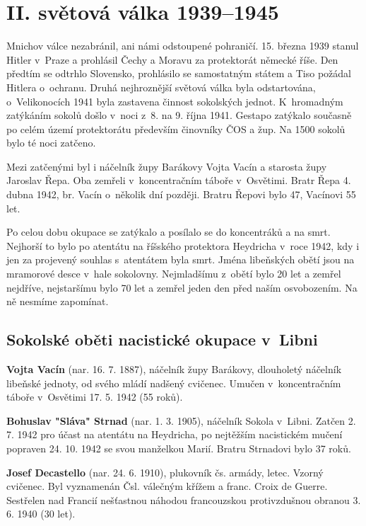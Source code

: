 \documentclass[a5paper, 11pt, twoside]{article}
\begin{document}
\section{II. světová válka
1939--1945}

Mnichov válce nezabránil, ani námi odstoupené pohraničí. 15. března 1939
stanul Hitler v~Praze a prohlásil Čechy a Moravu za protektorát německé
říše. Den předtím se odtrhlo Slovensko, prohlásilo se samostatným státem
a Tiso požádal Hitlera o~ochranu. Druhá nejhroznější světová válka byla
odstartována, o~Velikonocích 1941 byla zastavena činnost sokolských
jednot. K~hromadným zatýkáním sokolů došlo v~noci z~8. na 9. října 1941.
Gestapo zatýkalo současně po celém území protektorátu především
činovníky ČOS a žup. Na 1500 sokolů bylo té noci zatčeno.

Mezi zatčenými byl i náčelník župy Barákovy Vojta Vacín a starosta župy
Jaroslav Řepa. Oba zemřeli v~koncentračním táboře v~Osvětimi. Bratr Řepa
4. dubna 1942, br. Vacín o~několik dní později. Bratru Řepovi bylo 47,
Vacínovi 55 let.

Po celou dobu okupace se zatýkalo a posílalo se do koncentráků a na
smrt. Nejhorší to bylo po atentátu na říšského protektora Heydricha
v~roce 1942, kdy i jen za projevený souhlas s~atentátem byla smrt. Jména
libeňských obětí jsou na mramorové desce v~hale sokolovny. Nejmladšímu
z~obětí bylo 20 let a zemřel nejdříve, nejstaršímu bylo 70 let a zemřel
jeden den před naším osvobozením. Na ně nesmíme zapomínat.

\subsection{Sokolské oběti nacistické okupace v~Libni}

\textbf{Vojta Vacín} (nar. 16. 7. 1887), náčelník župy Barákovy,
dlouholetý náčelník libeňské jednoty, od svého mládí nadšený cvičenec.
Umučen v~koncentračním táboře v~Osvětimi 17. 5. 1942 (55 roků).

\textbf{Bohuslav "Sláva" Strnad} (nar. 1. 3. 1905), náčelník Sokola
v~Libni. Zatčen 2. 7. 1942 pro účast na atentátu na Heydricha, po
nejtěžším nacistickém mučení popraven 24. 10. 1942 se svou manželkou
Marií. Bratru Strnadovi bylo 37 roků.

\textbf{Josef Decastello} (nar. 24. 6. 1910), plukovník čs. armády,
letec. Vzorný cvičenec. Byl vyznamenán Čsl. válečným křížem a franc.
Croix de Guerre. Sestřelen nad Francií nešťastnou náhodou
francouzskou protivzdušnou obranou 3. 6. 1940 (30 let).
\end{document}
